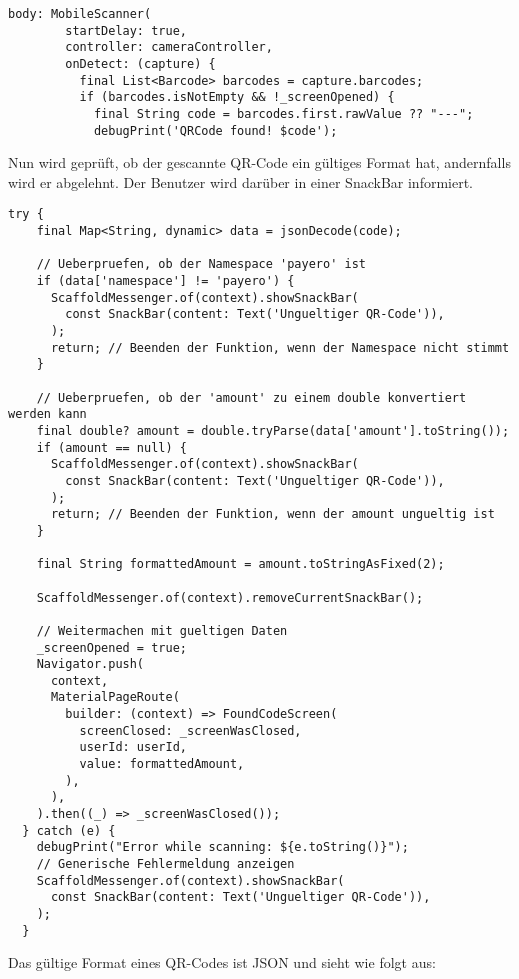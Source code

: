 \begin{lstlisting}[caption=QR-Code gefunden, label=qr_found]
  body: MobileScanner(
        startDelay: true,
        controller: cameraController,
        onDetect: (capture) {
          final List<Barcode> barcodes = capture.barcodes;
          if (barcodes.isNotEmpty && !_screenOpened) {
            final String code = barcodes.first.rawValue ?? "---";
            debugPrint('QRCode found! $code');
\end{lstlisting}

Nun wird geprüft, ob der gescannte QR-Code ein gültiges Format hat, andernfalls wird er abgelehnt.
Der Benutzer wird darüber in einer SnackBar informiert.

\begin{lstlisting}[caption={QR-Code Check}]
  try {
    final Map<String, dynamic> data = jsonDecode(code);

    // Ueberpruefen, ob der Namespace 'payero' ist
    if (data['namespace'] != 'payero') {
      ScaffoldMessenger.of(context).showSnackBar(
        const SnackBar(content: Text('Ungueltiger QR-Code')),
      );
      return; // Beenden der Funktion, wenn der Namespace nicht stimmt
    }

    // Ueberpruefen, ob der 'amount' zu einem double konvertiert werden kann
    final double? amount = double.tryParse(data['amount'].toString());
    if (amount == null) {
      ScaffoldMessenger.of(context).showSnackBar(
        const SnackBar(content: Text('Ungueltiger QR-Code')),
      );
      return; // Beenden der Funktion, wenn der amount ungueltig ist
    }

    final String formattedAmount = amount.toStringAsFixed(2);

    ScaffoldMessenger.of(context).removeCurrentSnackBar();

    // Weitermachen mit gueltigen Daten
    _screenOpened = true;
    Navigator.push(
      context,
      MaterialPageRoute(
        builder: (context) => FoundCodeScreen(
          screenClosed: _screenWasClosed,
          userId: userId,
          value: formattedAmount,
        ),
      ),
    ).then((_) => _screenWasClosed());
  } catch (e) {
    debugPrint("Error while scanning: ${e.toString()}");
    // Generische Fehlermeldung anzeigen
    ScaffoldMessenger.of(context).showSnackBar(
      const SnackBar(content: Text('Ungueltiger QR-Code')),
    );
  }
\end{lstlisting}

Das gültige Format eines QR-Codes ist JSON und sieht wie folgt aus:

